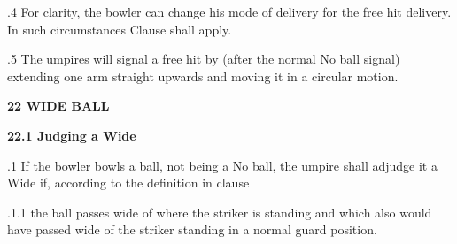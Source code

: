 \documentclass[12pt]{article}
\begin{document}
\vspace{\baselineskip}
\begin{adjustwidth}{0.5in}{0.4in}
{\fontsize{9pt}{10.8pt}.4 For clarity, the bowler can change his mode of delivery for the free hit delivery. In such circumstances Clause shall apply.\par}\par

\end{adjustwidth}


\vspace{\baselineskip}
\begin{adjustwidth}{0.5in}{0.0in}
{\fontsize{9pt}{10.8pt}.5 The umpires will signal a free hit by (after the normal No ball signal) extending one arm straight upwards and moving it in a circular motion.\par}\par

\end{adjustwidth}


\vspace{\baselineskip}
{\fontsize{16pt}{19.2pt}\selectfont \textbf{22 WIDE BALL}\par}\par


\vspace{\baselineskip}
{\fontsize{11pt}{13.2pt}\selectfont \textbf{22.1 \tabto{0.47in} Judging a Wide}\par}\par


\vspace{\baselineskip}
\begin{adjustwidth}{0.5in}{0.51in}
{\fontsize{9pt}{10.8pt}.1 \tabto{0.49in} If the bowler bowls a ball, not being a No ball, the umpire shall adjudge it a Wide if, according to the definition in clause \par}\par

\end{adjustwidth}


\vspace{\baselineskip}
\begin{adjustwidth}{1.18in}{0.07in}
{\fontsize{9pt}{10.8pt}.1.1 \tabto{1.17in} the ball passes wide of where the striker is standing and which also would have passed wide of the striker standing in a normal guard position.\par}\par

\end{adjustwidth}
\end{document}
